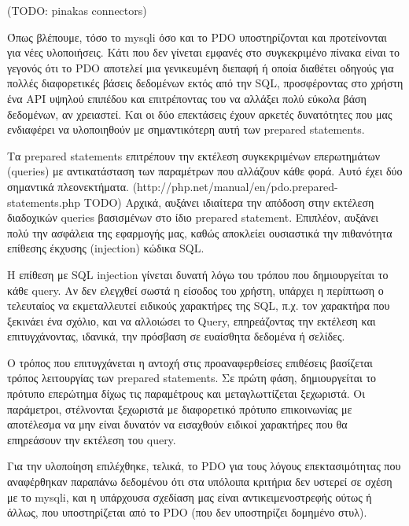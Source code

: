 \documentclass[diploma]{softlab-thesis}
\begin{document}
(TODO: pinakas connectors)

\bigskip

Όπως βλέπουμε, τόσο το mysqli όσο και το PDO υποστηρίζονται και προτείνονται
για νέες υλοποιήσεις. Κάτι που δεν γίνεται εμφανές στο συγκεκριμένο πίνακα
είναι το γεγονός ότι το PDO αποτελεί μια γενικευμένη διεπαφή ή οποία διαθέτει
οδηγούς για πολλές διαφορετικές βάσεις δεδομένων εκτός από την SQL,
προσφέροντας στο χρήστη ένα API υψηλού επιπέδου και επιτρέποντας του να αλλάξει
πολύ εύκολα βάση δεδομένων, αν χρειαστεί. Και οι δύο επεκτάσεις έχουν αρκετές
δυνατότητες που μας ενδιαφέρει να υλοποιηθούν με σημαντικότερη αυτή των
prepared statements. 

\bigskip

Τα prepared statements επιτρέπουν την εκτέλεση συγκεκριμένων επερωτημάτων
(queries) με αντικατάσταση των παραμέτρων που αλλάζουν κάθε φορά. Αυτό έχει δύο
σημαντικά πλεονεκτήματα. (http://php.net/manual/en/pdo.prepared-statements.php
TODO) Αρχικά, αυξάνει ιδιαίτερα την απόδοση στην εκτέλεση διαδοχικών queries
βασισμένων στο ίδιο prepared statement. Επιπλέον, αυξάνει πολύ την ασφάλεια της
εφαρμογής μας, καθώς αποκλείει ουσιαστικά την πιθανότητα επίθεσης έκχυσης
(injection) κώδικα SQL. 

\bigskip

Η επίθεση με SQL injection γίνεται δυνατή λόγω του τρόπου που δημιουργείται το
κάθε query. Αν δεν ελεγχθεί σωστά η είσοδος του χρήστη, υπάρχει η περίπτωση ο
τελευταίος να εκμεταλλευτεί ειδικούς χαρακτήρες της SQL, π.χ. τον χαρακτήρα που
ξεκινάει ένα σχόλιο, και να αλλοιώσει το Query, επηρεάζοντας την εκτέλεση και
επιτυγχάνοντας, ιδανικά, την πρόσβαση σε ευαίσθητα δεδομένα ή σελίδες.

\bigskip

Ο τρόπος που επιτυγχάνεται η αντοχή στις προαναφερθείσες επιθέσεις βασίζεται
τρόπος λειτουργίας των prepared statements. Σε πρώτη φάση, δημιουργείται το
πρότυπο επερώτημα δίχως τις παραμέτρους και μεταγλωττίζεται ξεχωριστά. Οι
παράμετροι, στέλνονται ξεχωριστά με διαφορετικό πρότυπο επικοινωνίας με
αποτέλεσμα να μην είναι δυνατόν να εισαχθούν ειδικοί χαρακτήρες που θα
επηρεάσουν την εκτέλεση του query.

\bigskip

Για την υλοποίηση επιλέχθηκε, τελικά, το PDO για τους λόγους επεκτασιμότητας
που αναφέρθηκαν παραπάνω δεδομένου ότι στα υπόλοιπα κριτήρια δεν υστερεί σε
σχέση με το mysqli, και η υπάρχουσα σχεδίαση μας είναι αντικειμενοστρεφής ούτως
ή άλλως, που υποστηρίζεται από το PDO (που δεν υποστηρίζει δομημένο στυλ).
\end{document}
